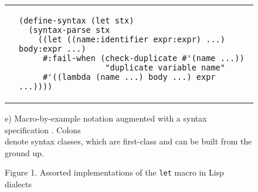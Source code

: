 \documentclass[10pt,journal,a4paper]{IEEEtran}
\begin{document}
\begin{figure*}[t]
\begin{listing}
\begin{tabular}{p{2.5cm} p{14.5cm}}\\
 &
\begin{verbatim}
(define-syntax (let stx)
  (syntax-parse stx
    ((let ((name:identifier expr:expr) ...) body:expr ...)
     #:fail-when (check-duplicate #'(name ...))
                  "duplicate variable name"
     #'((lambda (name ...) body ...) expr ...))))
\end{verbatim}
\end{tabular}

\begin{adjustwidth}{3.2cm}{0pt}
e) Macro-by-example notation augmented with a syntax specification \cite{culpepper10}.
Colons \\denote syntax classes, which are first-class and can be built from the ground up.
\end{adjustwidth}
\end{listing}
\end{figure*}

\begin{figure*}
\hskip3.95cm
\normalsize Figure 1. Assorted implementations of the \small \texttt{let} \normalsize macro in Lisp dialects
\end{figure*}
\end{document}
